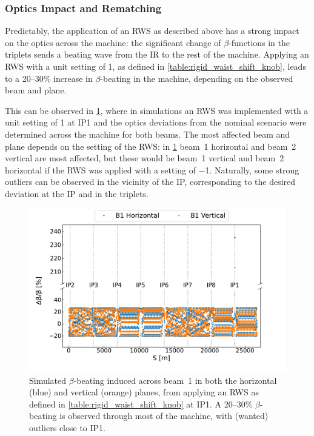 \subsubsection*{Optics Impact and Rematching}

Predictably, the application of an RWS as described above has a strong impact on the optics across the machine: the significant change of \(\beta\)-functions in the triplets sends a beating wave from the IR to the rest of the machine.
Applying an RWS with a unit setting of \num{1}, as defined in \cref{table:rigid_waist_shift_knob}, leads to a \numrange[range-phrase = --]{20}{30}\unit{\percent} increase in \(\beta\)-beating in the machine, depending on the observed beam and plane.

This can be observed in \cref{figure:rigid_waist_shift_betabeating}, where in simulations an RWS was implemented with a unit setting of \num{1} at IP\num{1} and the optics deviations from the nominal scenario were determined across the machine for both beams.
The most affected beam and plane depends on the setting of the RWS: in \cref{figure:rigid_waist_shift_betabeating} beam~\num{1} horizontal and beam~\num{2} vertical are most affected, but these would be beam~\num{1} vertical and beam~\num{2} horizontal if the RWS was applied with a setting of \num{-1}.
Naturally, some strong outliers can be observed in the vicinity of the IP, corresponding to the desired deviation at the IP and in the triplets.

\begin{figure}[!htb]
    \centering
    \includegraphics[width=\textwidth]{Figures/IR_Coupling_Correction/rws_ir1_b1_bbeating.pdf}
    \caption{Simulated \(\beta\)-beating induced across beam~\num{1} in both the horizontal (\textcolor{mplblue}{blue}) and vertical (\textcolor{mplorange}{orange}) planes, from applying an RWS as defined in \cref{table:rigid_waist_shift_knob} at IP\num{1}. A \numrange{20}{30}\unit{\percent} \(\beta\)-beating is observed through most of the machine, with (wanted) outliers close to IP\num{1}.}
    \label{figure:rigid_waist_shift_betabeating}
\end{figure}


